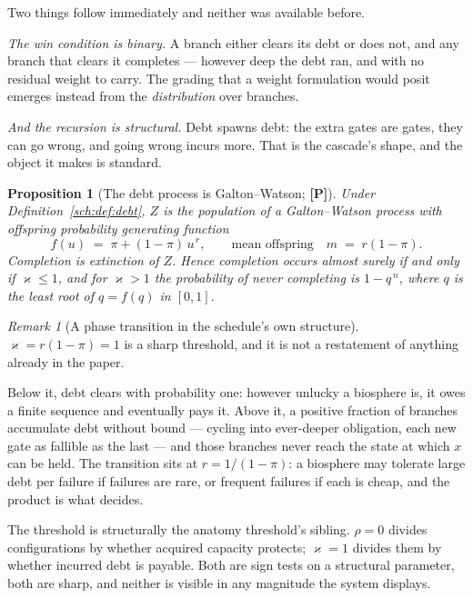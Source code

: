 \documentclass[11pt]{article}
\numberwithin{equation}{section}
\theoremstyle{plain}
\newtheorem{proposition}[theorem]{Proposition}
\theoremstyle{definition}
\theoremstyle{remark}
\newtheorem{remark}[theorem]{Remark}
\begin{document}
Two things follow immediately and neither was available before.

\emph{The win condition is binary.} A branch either clears its debt or
does not, and any branch that clears it completes --- however deep the
debt ran, and with no residual weight to carry. The grading that a
weight formulation would posit emerges instead from the
\emph{distribution} over branches.

\emph{And the recursion is structural.} Debt spawns debt: the extra
gates are gates, they can go wrong, and going wrong incurs more. That is
the cascade's shape, and the object it makes is standard.

\begin{proposition}[The debt process is Galton--Watson; \textbf{[P]}]
\label{sch:prop:gw}
Under Definition~\ref{sch:def:debt}, $Z$ is the population of a
Galton--Watson process with offspring probability generating function
\begin{equation}\label{sch:eq:pgf}
f(u)\;=\;\pi+(1-\pi)\,u^{\,r},
\qquad\text{mean offspring}\quad m\;=\;r(1-\pi).
\end{equation}
Completion is extinction of $Z$. Hence completion occurs almost surely
if and only if $\varkappa\le1$, and for $\varkappa>1$ the probability of never
completing is $1-q^{\,n}$, where $q$ is the least root of $q=f(q)$ in
$[0,1]$.
\end{proposition}

\begin{remark}[A phase transition in the schedule's own structure]
\label{sch:rem:criticality}
$\varkappa=r(1-\pi)=1$ is a sharp threshold, and it is not a restatement of
anything already in the paper.

Below it, debt clears with probability one: however unlucky a biosphere
is, it owes a finite sequence and eventually pays it. Above it, a
positive fraction of branches accumulate debt without bound --- cycling
into ever-deeper obligation, each new gate as fallible as the last ---
and those branches never reach the state at which $x$ can be held. The
transition sits at $r=1/(1-\pi)$: a biosphere may tolerate large debt
per failure if failures are rare, or frequent failures if each is cheap,
and the product is what decides.

The threshold is structurally the anatomy threshold's sibling. $\rho=0$
divides configurations by whether acquired capacity protects; $\varkappa=1$
divides them by whether incurred debt is payable. Both are sign tests on
a structural parameter, both are sharp, and neither is visible in any
magnitude the system displays.
\end{remark}
\end{document}
